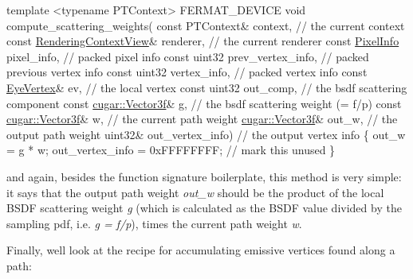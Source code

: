 \begin{DoxyCodeInclude}
    \textcolor{keyword}{template} <\textcolor{keyword}{typename} PTContext>
    FERMAT\_DEVICE
    \textcolor{keywordtype}{void} compute\_scattering\_weights(
        \textcolor{keyword}{const} PTContext&            context,                \textcolor{comment}{// the current context}
        \textcolor{keyword}{const} \hyperlink{struct_rendering_context_view}{RenderingContextView}& renderer,               \textcolor{comment}{// the current renderer}
        \textcolor{keyword}{const} \hyperlink{union_pixel_info}{PixelInfo}                pixel\_info,             \textcolor{comment}{// packed pixel info}
        \textcolor{keyword}{const} uint32                prev\_vertex\_info,       \textcolor{comment}{// packed previous vertex info}
        \textcolor{keyword}{const} uint32                vertex\_info,            \textcolor{comment}{// packed vertex info}
        \textcolor{keyword}{const} \hyperlink{struct_eye_vertex}{EyeVertex}&           ev,                     \textcolor{comment}{// the local vertex}
        \textcolor{keyword}{const} uint32                out\_comp,               \textcolor{comment}{// the bsdf scattering component}
        \textcolor{keyword}{const} \hyperlink{structcugar_1_1_vector}{cugar::Vector3f}&       g,                      \textcolor{comment}{// the bsdf scattering weight
       (= f/p)}
        \textcolor{keyword}{const} \hyperlink{structcugar_1_1_vector}{cugar::Vector3f}&       w,                      \textcolor{comment}{// the current path weight}
              \hyperlink{structcugar_1_1_vector}{cugar::Vector3f}&       out\_w,                  \textcolor{comment}{// the output path weight}
              uint32&               out\_vertex\_info)        \textcolor{comment}{// the output vertex info}
    \{
        out\_w = g * w;
        out\_vertex\_info = 0xFFFFFFFF; \textcolor{comment}{// mark this unused}
    \}
\end{DoxyCodeInclude}
 \begin{DoxyParagraph}{}
and again, besides the function signature boilerplate, this method is very simple\+: it says that the output path weight {\itshape out\+\_\+w} should be the product of the local B\+S\+DF scattering weight {\itshape g} (which is calculated as the B\+S\+DF value divided by the sampling pdf, i.\+e. {\itshape g = f/p}), times the current path weight {\itshape w}.
\end{DoxyParagraph}
\begin{DoxyParagraph}{}
Finally, we\textquotesingle{}ll look at the recipe for accumulating emissive vertices found along a path\+:
\end{DoxyParagraph}

